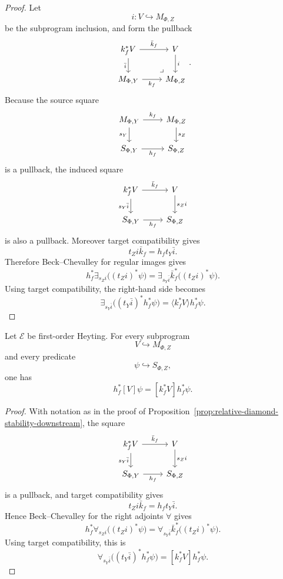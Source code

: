 \begin{proof}
Let
\[
i:V\hookrightarrow M_{\Phi,Z}
\]
be the subprogram inclusion, and form the pullback
\[
\begin{tikzcd}
k_f^\ast V \arrow[r,"\bar k_f"] \arrow[d,"\bar i"']
&
V \arrow[d,"i"]
\\
M_{\Phi,Y} \arrow[r,"k_f"']
&
M_{\Phi,Z}
\arrow[ul,phantom,very near start,"\lrcorner"]
\end{tikzcd}
.
\]
Because the source square
\[
\begin{tikzcd}
M_{\Phi,Y} \arrow[r,"k_f"] \arrow[d,"s_Y"']
&
M_{\Phi,Z} \arrow[d,"s_Z"]
\\
S_{\Phi,Y} \arrow[r,"h_f"']
&
S_{\Phi,Z}
\end{tikzcd}
\]
is a pullback, the induced square
\[
\begin{tikzcd}
k_f^\ast V \arrow[r,"\bar k_f"] \arrow[d,"s_Y\bar i"']
&
V \arrow[d,"s_Z i"]
\\
S_{\Phi,Y} \arrow[r,"h_f"']
&
S_{\Phi,Z}
\end{tikzcd}
\]
is also a pullback. Moreover target compatibility gives
\[
t_Z i\bar k_f=h_f t_Y\bar i.
\]
Therefore Beck--Chevalley for regular images gives
\[
h_f^\ast\exists_{s_Z i}\bigl((t_Z i)^\ast\psi\bigr)
=
\exists_{s_Y\bar i}\bar k_f^\ast\bigl((t_Z i)^\ast\psi\bigr).
\]
Using target compatibility, the right-hand side becomes
\[
\exists_{s_Y\bar i}\bigl((t_Y\bar i)^\ast h_f^\ast\psi\bigr)
=
\langle k_f^\ast V\rangle h_f^\ast\psi.
\]
\end{proof}

\begin{proposition}
\label{prop:relative-box-stability-downstream}
Let \(\mathcal E\) be first-order Heyting. For every subprogram
\[
V\hookrightarrow M_{\Phi,Z}
\]
and every predicate
\[
\psi\hookrightarrow S_{\Phi,Z},
\]
one has
\[
h_f^\ast[V]\psi
=
[k_f^\ast V]h_f^\ast\psi.
\]
\end{proposition}

\begin{proof}
With notation as in the proof of
Proposition~\ref{prop:relative-diamond-stability-downstream}, the square
\[
\begin{tikzcd}
k_f^\ast V \arrow[r,"\bar k_f"] \arrow[d,"s_Y\bar i"']
&
V \arrow[d,"s_Z i"]
\\
S_{\Phi,Y} \arrow[r,"h_f"']
&
S_{\Phi,Z}
\end{tikzcd}
\]
is a pullback, and target compatibility gives
\[
t_Z i\bar k_f=h_f t_Y\bar i.
\]
Hence Beck--Chevalley for the right adjoints \(\forall\) gives
\[
h_f^\ast\forall_{s_Z i}\bigl((t_Z i)^\ast\psi\bigr)
=
\forall_{s_Y\bar i}\bar k_f^\ast\bigl((t_Z i)^\ast\psi\bigr).
\]
Using target compatibility, this is
\[
\forall_{s_Y\bar i}\bigl((t_Y\bar i)^\ast h_f^\ast\psi\bigr)
=
[k_f^\ast V]h_f^\ast\psi.
\]
\end{proof}


